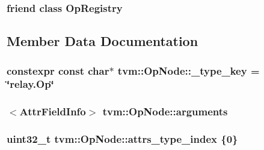 \subsubsection[{\texorpdfstring{Op\+Registry}{OpRegistry}}]{\setlength{\rightskip}{0pt plus 5cm}friend class {\bf Op\+Registry}\hspace{0.3cm}{\ttfamily [friend]}}\hypertarget{classtvm_1_1OpNode_af7ebaf5af32d51226208f533e6d5cb1d}{}\label{classtvm_1_1OpNode_af7ebaf5af32d51226208f533e6d5cb1d}


\subsection{Member Data Documentation}
\subsubsection[{\texorpdfstring{\+\_\+type\+\_\+key}{_type_key}}]{\setlength{\rightskip}{0pt plus 5cm}constexpr const char$\ast$ tvm\+::\+Op\+Node\+::\+\_\+type\+\_\+key = \char`\"{}relay.\+Op\char`\"{}\hspace{0.3cm}{\ttfamily [static]}}\hypertarget{classtvm_1_1OpNode_a2c50dc0d1b84d52d6da19a6fa3fcabac}{}\label{classtvm_1_1OpNode_a2c50dc0d1b84d52d6da19a6fa3fcabac}
\subsubsection[{\texorpdfstring{arguments}{arguments}}]{$<${\bf Attr\+Field\+Info}$>$ tvm\+::\+Op\+Node\+::arguments}\hypertarget{classtvm_1_1OpNode_af753e9ea21f09017bb61d5722b2ce181}{}\label{classtvm_1_1OpNode_af753e9ea21f09017bb61d5722b2ce181}
\subsubsection[{\texorpdfstring{attrs\+\_\+type\+\_\+index}{attrs_type_index}}]{\setlength{\rightskip}{0pt plus 5cm}uint32\+\_\+t tvm\+::\+Op\+Node\+::attrs\+\_\+type\+\_\+index \{0\}}\hypertarget{classtvm_1_1OpNode_a4b7f1c6f18ede931328377bb8794c1bc}{}\label{classtvm_1_1OpNode_a4b7f1c6f18ede931328377bb8794c1bc}



